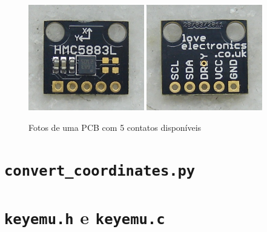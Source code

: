 \documentclass[brazil,pagestart=firstchapter]{abnt}
\begin{document}
\begin{figure}[h]
\centering
\includegraphics[width=0.45\textwidth]{img/sensor_other_pcb_front.jpg}
\includegraphics[width=0.45\textwidth]{img/sensor_other_pcb_back.jpg}
\caption{Fotos de uma PCB com 5 contatos disponíveis}
\label{fig:loveelectronics_photos}
\end{figure}









\apendice


\chapter{\texttt{convert\_coordinates.py}}
\label{ape:convert_coordinates}


\chapter{\texttt{keyemu.h} e \texttt{keyemu.c}}
\label{ape:keyemu}

\clearpage

\end{document}
